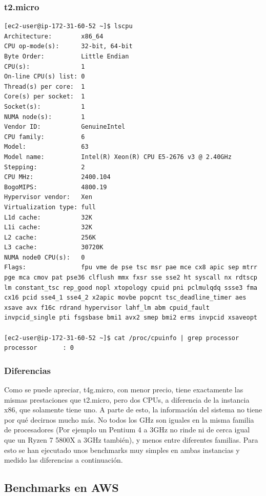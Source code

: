 \documentclass[a4paper,openright,12pt]{article}
\begin{document}
\subsubsection{t2.micro}
\begin{verbatim}
[ec2-user@ip-172-31-60-52 ~]$ lscpu
Architecture:        x86_64
CPU op-mode(s):      32-bit, 64-bit
Byte Order:          Little Endian
CPU(s):              1
On-line CPU(s) list: 0
Thread(s) per core:  1
Core(s) per socket:  1
Socket(s):           1
NUMA node(s):        1
Vendor ID:           GenuineIntel
CPU family:          6
Model:               63
Model name:          Intel(R) Xeon(R) CPU E5-2676 v3 @ 2.40GHz
Stepping:            2
CPU MHz:             2400.104
BogoMIPS:            4800.19
Hypervisor vendor:   Xen
Virtualization type: full
L1d cache:           32K
L1i cache:           32K
L2 cache:            256K
L3 cache:            30720K
NUMA node0 CPU(s):   0
Flags:               fpu vme de pse tsc msr pae mce cx8 apic sep mtrr pge mca cmov pat pse36 clflush mmx fxsr sse sse2 ht syscall nx rdtscp lm constant_tsc rep_good nopl xtopology cpuid pni pclmulqdq ssse3 fma cx16 pcid sse4_1 sse4_2 x2apic movbe popcnt tsc_deadline_timer aes xsave avx f16c rdrand hypervisor lahf_lm abm cpuid_fault invpcid_single pti fsgsbase bmi1 avx2 smep bmi2 erms invpcid xsaveopt

[ec2-user@ip-172-31-60-52 ~]$ cat /proc/cpuinfo | grep processor
processor       : 0
\end{verbatim}

\subsubsection{Diferencias}
Como se puede apreciar, t4g.micro, con menor precio, tiene exactamente las mismas prestaciones que t2.micro, pero dos CPUs, a diferencia de la instancia x86, que solamente tiene uno.
A parte de esto, la información del sistema no tiene por qué decirnos mucho más. No todos los GHz son iguales en la misma familia de procesadores (Por ejemplo un Pentium 4 a 3GHz no rinde
ni de cerca igual que un Ryzen 7 5800X a 3GHz también), y menos entre diferentes familias. Para esto se han ejecutado unos benchmarks muy simples en ambas instancias y medido las diferencias
a continuación.

\subsection{Benchmarks en AWS}\label{subsection:benchmarks_aws}
\end{document}

